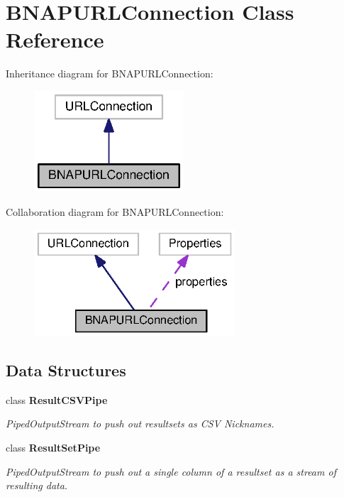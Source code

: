 \section{B\+N\+A\+P\+U\+R\+L\+Connection Class Reference}
\label{classorg_1_1smallfoot_1_1parser_1_1bnapsql_1_1BNAPURLConnection}


Inheritance diagram for B\+N\+A\+P\+U\+R\+L\+Connection\+:\nopagebreak
\begin{figure}[H]
\begin{center}
\leavevmode
\includegraphics[width=158pt]{classorg_1_1smallfoot_1_1parser_1_1bnapsql_1_1BNAPURLConnection__inherit__graph}
\end{center}
\end{figure}


Collaboration diagram for B\+N\+A\+P\+U\+R\+L\+Connection\+:\nopagebreak
\begin{figure}[H]
\begin{center}
\leavevmode
\includegraphics[width=212pt]{classorg_1_1smallfoot_1_1parser_1_1bnapsql_1_1BNAPURLConnection__coll__graph}
\end{center}
\end{figure}
\subsection*{Data Structures}
\begin{DoxyCompactItemize}
\item 
class {\bfseries Result\+C\+S\+V\+Pipe}
\begin{DoxyCompactList}\small\item\em Piped\+Output\+Stream to push out resultsets as C\+S\+V Nicknames. \end{DoxyCompactList}\item 
class {\bfseries Result\+Set\+Pipe}
\begin{DoxyCompactList}\small\item\em Piped\+Output\+Stream to push out a single column of a resultset as a stream of resulting data. \end{DoxyCompactList}\end{DoxyCompactItemize}

